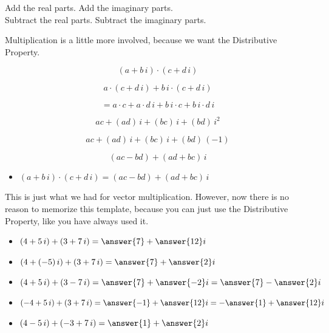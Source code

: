 \documentclass{ximera}
\begin{document}
Add the real parts. Add the imaginary parts. \\
Subtract the real parts. Subtract the imaginary parts. 








Multiplication is a little more involved, because we want the Distributive Property.

\[
(a + b \, i) \cdot (c + d \, i) 
\]

\[
a \cdot (c + d \, i) + b \, i \cdot (c + d \, i) 
\]

\[
= a \cdot c + a \cdot d \, i + b \, i \cdot c  + b \, i \cdot d \, i
\]

\[
a c  + (a d) \, i + (b c) \, i  + (b d) \, i^2
\]


\[
a c  + (a d) \, i + (b c) \, i + (b d) \, (-1)
\]


\[
(a c - b d) + (a d + b c) \, i 
\]



\begin{itemize}
	\item $(a + b \, i) \cdot (c + d \, i) = (ac - bd) + (ad + bc) \, i$
\end{itemize}



This is just what we had for vector multiplication.  However, now there is no reason to memorize this template, because you can just use the Distributive Property, like you have always used it.






\begin{question}


\begin{itemize}
\item   $(4 + 5 \, i) + (3 + 7 \, i) = \answer{7} + \answer{12} i$
\item   $(4 + (-5) \, i) + (3 + 7 \, i) = \answer{7} + \answer{2} i$
\item   $(4 + 5 \, i) + (3 - 7 \, i) = \answer{7} + \answer{-2} i = \answer{7} - \answer{2} i$
\item   $(-4 + 5 \, i) + (3 + 7 \, i) = \answer{-1} + \answer{12} i = -\answer{1} + \answer{12} i$
\item   $(4 - 5 \, i) + (-3 + 7 \, i) = \answer{1} + \answer{2} i$
\end{itemize}



\end{question}
\end{document}
